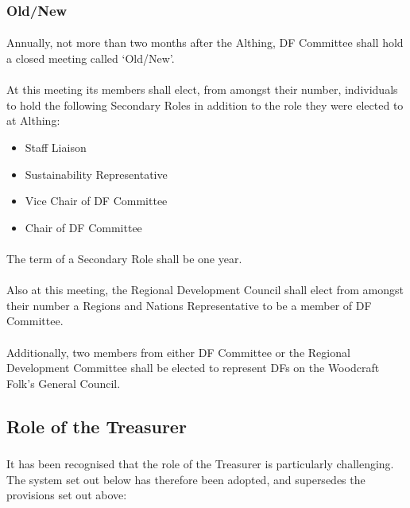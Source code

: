 \documentclass[a4paper, 12pt]{article}
\begin{document}
\subsubsection{Old/New}
\label{sec:oldnew}
\paragraph{} Annually, not more than two months after the Althing, DF Committee shall hold a closed meeting called `Old/New'.
\paragraph{} At this meeting its members shall elect, from amongst their number, individuals to hold the following Secondary Roles in addition to the role they were elected to at Althing:
\begin{itemize}
\item Staff Liaison
\item Sustainability Representative
\item Vice Chair of DF Committee
\item Chair of DF Committee
\end{itemize}

\paragraph{} The term of a Secondary Role shall be one year.

\paragraph{} \label{par:regionsandnationsrep} Also at this meeting, the Regional Development Council shall elect from amongst their number a Regions and Nations Representative to be a member of DF Committee.

\paragraph{} Additionally, two members from either DF Committee or the Regional Development Committee shall be elected to represent DFs on the Woodcraft Folk's General Council.

\subsection{Role of the Treasurer}
\label{sec:treasurerrole}
\subsubsection{}
It has been recognised that the role of the Treasurer is particularly challenging. The system set out below has therefore been adopted, and supersedes the provisions set out above:
\end{document}
